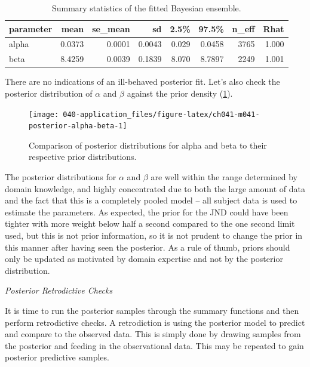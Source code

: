 \documentclass[11pt, oneside, openany]{scrbook}
\begin{document}

\begin{table}[!h]

\caption{\label{tab:ch041-Maroon-Oyster}Summary statistics of the fitted Bayesian ensemble.}
\centering
\begin{tabular}[t]{lrrrrrrr}
\toprule
parameter & mean & se\_mean & sd & 2.5\% & 97.5\% & n\_eff & Rhat\\
\midrule
alpha & 0.0373 & 0.0001 & 0.0043 & 0.029 & 0.0458 & 3765 & 1.000\\
beta & 8.4259 & 0.0039 & 0.1839 & 8.070 & 8.7897 & 2249 & 1.001\\
\bottomrule
\end{tabular}
\end{table}

There are no indications of an ill-behaved posterior fit. Let's also check the posterior distribution of \(\alpha\) and \(\beta\) against the prior density (\ref{fig:ch041-m041-posterior-alpha-beta}).

\begin{figure}

{\centering \texttt{[image: 040-application\_files/figure-latex/ch041-m041-posterior-alpha-beta-1]} 

}

\caption{Comparison of posterior distributions for alpha and beta to their respective prior distributions.}\label{fig:ch041-m041-posterior-alpha-beta}
\end{figure}

The posterior distributions for \(\alpha\) and \(\beta\) are well within the range determined by domain knowledge, and highly concentrated due to both the large amount of data and the fact that this is a completely pooled model -- all subject data is used to estimate the parameters. As expected, the prior for the JND could have been tighter with more weight below half a second compared to the one second limit used, but this is not prior information, so it is not prudent to change the prior in this manner after having seen the posterior. As a rule of thumb, priors should only be updated as motivated by domain expertise and not by the posterior distribution.

\emph{Posterior Retrodictive Checks}

It is time to run the posterior samples through the summary functions and then perform retrodictive checks. A retrodiction is using the posterior model to predict and compare to the observed data. This is simply done by drawing samples from the posterior and feeding in the observational data. This may be repeated to gain posterior predictive samples.
\end{document}
